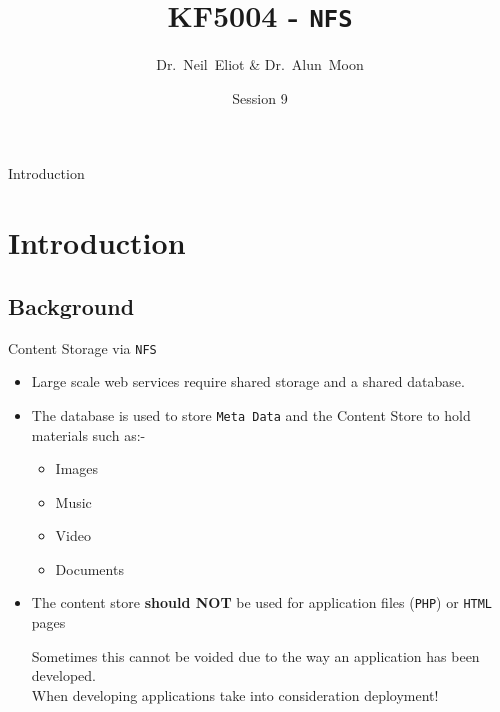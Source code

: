 \documentclass[xcolor=table]{beamer}
\title{KF5004 - \texttt{NFS}}
\author{Dr.~Neil~Eliot \& Dr.~Alun~Moon}
\institute[Northumbria University] %
{
  Department of Computer and Information Sciences\\
  University of Northumbria
}
\date{Session 9}
\begin{document}
\begin{frame}
  \titlepage
\end{frame}

\begin{frame}{Introduction}
  \tableofcontents
\end{frame}


\section{Introduction}
\subsection{Background}
\begin{frame}{Content Storage via \texttt{NFS}}
  \begin{itemize}
    \item Large scale web services require shared storage and a shared database.
    \item The database is used to store \texttt{Meta Data} and the Content Store to hold materials such as:-    
      \begin{itemize}
        \item Images
        \item Music
        \item Video
        \item Documents
      \end{itemize}
    \item The content store \textbf{should NOT} be used for application files (\texttt{PHP}) or \texttt{HTML} pages
      \begin{tcolorbox}
        \begin{center}
          \scriptsize Sometimes this cannot be voided due to the way an application has been developed. \\When developing applications take into consideration deployment!
        \end{center}
      \end{tcolorbox}
  \end{itemize}
\end{frame}
\end{document}
